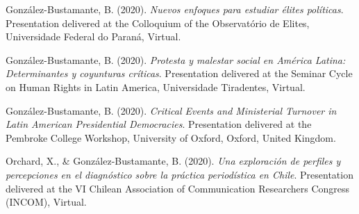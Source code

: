 \begin{publications}
\begin{benumerate}{87}
\item{\small González-Bustamante, B. (2020). {\itshape Nuevos enfoques para estudiar élites políticas}. Presentation delivered at the Colloquium of the Observatório de Elites, Universidade Federal do Paraná, Virtual.}\vspace{1mm}


\item{González-Bustamante, B. (2020). {\itshape Protesta y malestar social en América Latina: Determinantes y coyunturas críticas}. Presentation delivered at the Seminar Cycle on Human Rights in Latin America, Universidade Tiradentes, Virtual.}\vspace{1mm}


\item{González-Bustamante, B. (2020). {\itshape Critical Events and Ministerial Turnover in Latin American Presidential Democracies}. Presentation delivered at the Pembroke College Workshop, University of Oxford, Oxford, United Kingdom.}\vspace{1mm}


\item{Orchard, X., \& González-Bustamante, B. (2020). {\itshape Una exploración de perfiles y percepciones en el diagnóstico sobre la práctica periodística en Chile}. Presentation delivered at the VI Chilean Association of Communication Researchers Congress (INCOM), Virtual.}\vspace{1mm}


\end{benumerate}
\end{publications}
